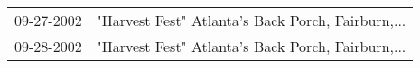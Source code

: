 \begin{supertabular}{ll}
 09-27-2002 &  "Harvest Fest" Atlanta's Back Porch, Fairburn,... \\
 09-28-2002 &  "Harvest Fest" Atlanta's Back Porch, Fairburn,... \\
\end{supertabular}
